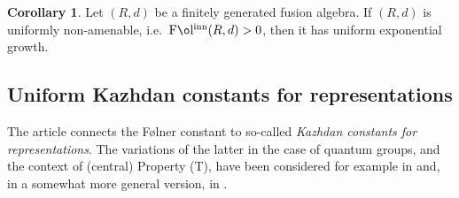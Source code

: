 \documentclass[11 pt, leqno]{amsart}
\newcommand{\ov}{\overline}
\newcommand{\NN}{\mathbb{N}}
\DeclareMathOperator{\Fol}{F\mathrm{\o}l}
\DeclareMathOperator{\Folinn}{F\mathrm{\o}l^{inn}}
\theoremstyle{definition}
\newtheorem{corollary}[theorem]{Corollary}
\numberwithin{equation}{section}
\begin{document}

\begin{corollary}
Let $(R,d)$ be a finitely generated fusion algebra. If $(R,d)$ is uniformly non-amenable, i.e.\ $\Folinn(R,d)>0$, then it has uniform exponential growth.
\end{corollary}


\subsection{Uniform Kazhdan constants for representations}

The article \cite{Arzhantseva} connects the F\o lner constant to  so-called \emph{Kazhdan  constants for representations}. The variations of the latter in the case of quantum groups, and the context of (central) Property (T), have been considered for example in \cite{Fima} and, in a somewhat more general version, in \cite{DSV}. 
\end{document}
